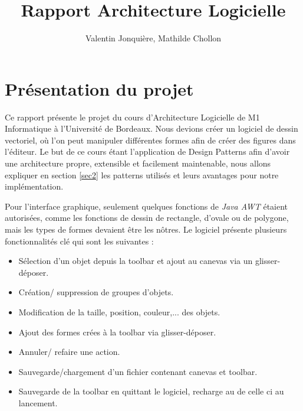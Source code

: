 \documentclass{article}
\author{
    Valentin Jonquière,
    Mathilde Chollon
}
\title{Rapport Architecture Logicielle}
\begin{document}
\maketitle

\pagebreak

\tableofcontents

\pagebreak

\section{Présentation du projet}

Ce rapport présente le projet du cours d'Architecture Logicielle de M1 Informatique à l'Université de Bordeaux.
Nous devions créer un logiciel de dessin vectoriel, où l'on peut manipuler différentes formes afin de créer des figures dans l'éditeur.
Le but de ce cours étant l'application de Design Patterns afin d'avoir une architecture propre, extensible et facilement maintenable, 
nous allons expliquer en section \ref{sec2} les patterns utilisés et leurs avantages pour notre implémentation.

Pour l'interface graphique, seulement quelques fonctions de \textit{Java AWT} étaient autorisées, comme les fonctions de dessin de rectangle, d'ovale ou de polygone, mais les types de formes devaient
être les nôtres.
Le logiciel présente plusieurs fonctionnalités clé qui sont les suivantes :
\begin{itemize}
    \item Sélection d'un objet depuis la toolbar et ajout au canevas via un glisser-déposer.
    \item Création/ suppression de groupes d'objets.
    \item Modification de la taille, position, couleur,... des objets.
    \item Ajout des formes crées à la toolbar via glisser-déposer.
    \item Annuler/ refaire une action.
    \item Sauvegarde/chargement d'un fichier contenant canevas et toolbar.
    \item Sauvegarde de la toolbar en quittant le logiciel, recharge au de celle ci au lancement.
\end{itemize}
\end{document}
